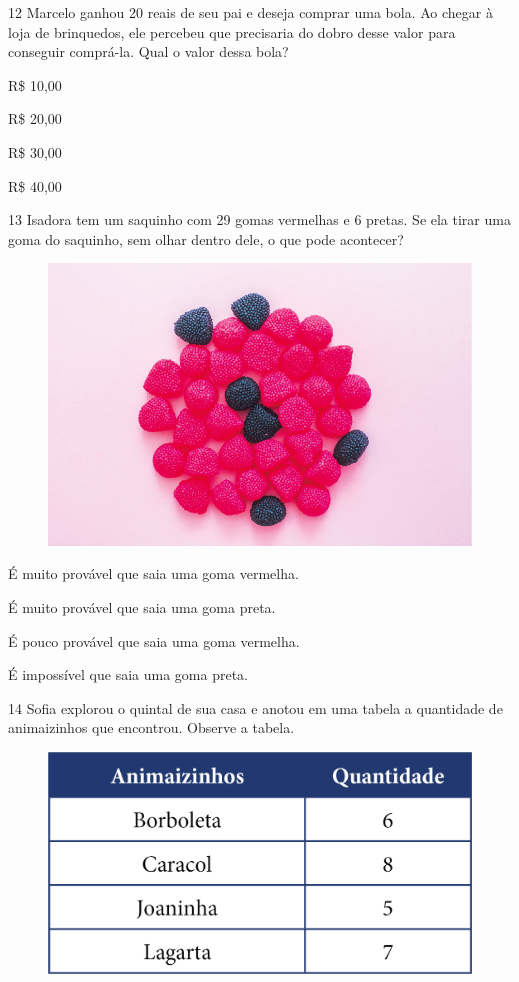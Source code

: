 \num{12} Marcelo ganhou 20 reais de seu pai e deseja comprar uma bola. Ao chegar
à loja de brinquedos, ele percebeu que precisaria do dobro desse valor
para conseguir comprá-la. Qual o valor dessa bola?

\begin{escolha}[itemsep=-5pt]
\item R\$ 10,00

\item R\$ 20,00

\item R\$ 30,00

\item R\$ 40,00
\end{escolha}

\num{13} Isadora tem um saquinho com 29 gomas vermelhas e 6 pretas. Se ela tirar
uma goma do saquinho, sem olhar dentro dele, o que pode acontecer?

\begin{figure}[H]
\centering
\includegraphics[width=.6\textwidth]{./media/image132.png}
\end{figure}

\begin{escolha}[itemsep=-5pt]
\item É muito provável que saia uma goma vermelha.

\item É muito provável que saia uma goma preta.

\item É pouco provável que saia uma goma vermelha.

\item É impossível que saia uma goma preta.
\end{escolha}


\num{14} Sofia explorou o quintal de sua casa e anotou em uma tabela a quantidade
de animaizinhos que encontrou. Observe a tabela.

\begin{figure}[H]
\centering
\includegraphics[width=.7\textwidth]{./media/image135.png}
\end{figure}

